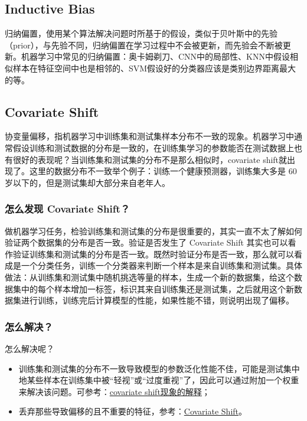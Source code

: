 \subsection{Inductive Bias}
归纳偏置，使用某个算法解决问题时所基于的假设，类似于贝叶斯中的先验（prior），与先验不同，归纳偏置在学习过程中不会被更新，而先验会不断被更新。机器学习中常见的归纳偏置：奥卡姆剃刀、CNN中的局部性、KNN中假设相似样本在特征空间中也是相邻的、SVM假设好的分类器应该是类别边界距离最大的等。

\subsection{Covariate Shift}
协变量偏移，指机器学习中训练集和测试集样本分布不一致的现象。机器学习中通常假设训练和测试数据的分布是一致的，在训练集学习的参数能否在测试数据上也有很好的表现呢？当训练集和测试集的分布不是那么相似时，covariate shift就出现了。这里的数据分布不一致举个例子：训练一个健康预测器，训练集大多是 60 岁以下的，但是测试集却大部分来自老年人。

\subsubsection{怎么发现 Covariate Shift？}
做机器学习任务，检验训练集和测试集的分布是很重要的，其实一直不太了解如何验证两个数据集的分布是否一致。验证是否发生了 Covariate Shift 其实也可以看作验证训练集和测试集的分布是否一致。既然时验证分布是否一致，那么就可以看成是一个分类任务，训练一个分类器来判断一个样本是来自训练集和测试集。具体做法：从训练集和测试集中随机挑选等量的样本，生成一个新的数据集，给这个数据集中的每个样本增加一标签，标识其来自训练集还是测试集，之后就用这个新数据集进行训练，训练完后计算模型的性能，如果性能不错，则说明出现了偏移。

\subsubsection{怎么解决？}
怎么解决呢？
\begin{itemize}
	\item 训练集和测试集的分布不一致导致模型的参数泛化性能不佳，可能是测试集中地某些样本在训练集中被“轻视”或“过度重视”了，因此可以通过附加一个权重来解决该问题。可参考：\href{https://blog.csdn.net/mao_xiao_feng/article/details/54317852}{covariate shift现象的解释}；
	\item 丢弃那些导致偏移的且不重要的特征，参考：\href{https://zhuanlan.zhihu.com/p/205183444}{Covariate Shift}。
\end{itemize}

